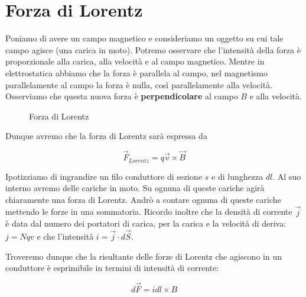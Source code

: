 \section{Forza di Lorentz}
Poniamo di avere un campo magnetico e consideriamo un oggetto su cui tale campo agisce (una carica in moto). Potremo osservare che l'intensità della forza è proporzionale alla carica, alla velocità e al campo magnetico. Mentre in elettrostatica abbiamo che la forza è parallela al campo, nel magnetismo parallelamente al campo la forza è nulla, così parallelamente alla velocità. Osserviamo che questa nuova forza è \textbf{perpendicolare} al campo $B$ e alla velocità. 

\begin{figure}[th]
	\centering
	\caption{Forza di Lorentz}
\end{figure}

Dunque avremo che la forza di Lorentz sarà espressa da 

\begin{large}
	\begin{equation} \label{eq:forza_lorentz}
		\vec{F}_{Lorentz} = q \vec{v} \times \vec{B}
	\end{equation}
\end{large}

Ipotizziamo di ingrandire un filo conduttore di sezione $s$ e di lunghezza $dl$. Al suo interno avremo delle cariche in moto. Su ognuna di queste cariche agirà chiaramente una forza di Lorentz. Andrò a contare ognuna di queste cariche mettendo le forze in una sommatoria. Ricordo inoltre che la densità di corrente $\vec{j}$ è data dal numero dei portatori di carica, per la carica e la velocità di deriva: $j = Nqv$ e che l'intensità $i = \vec{j} \cdot d\vec{S}$. 

Troveremo dunque che la risultante delle forze di Lorentz che agiscono in un conduttore è esprimibile in termini di intensità di corrente:

\begin{large}
	\begin{equation}
		d\vec{F} = idl \times B
	\end{equation}
\end{large}

